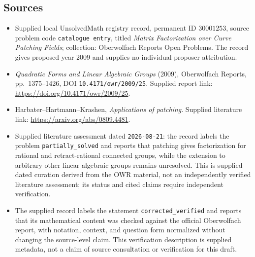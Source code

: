 \documentclass[11pt]{article}
\begin{document}
\subsection{Sources}
\begin{itemize}
\item Supplied local UnsolvedMath registry record, permanent ID \(30001253\), source problem code \texttt{catalogue entry}, titled \emph{Matrix Factorization over Curve Patching Fields}; collection: Oberwolfach Reports Open Problems. The record gives proposed year 2009 and supplies no individual proposer attribution.
\item \emph{Quadratic Forms and Linear Algebraic Groups} (2009), Oberwolfach Reports, pp.\ 1375--1426, DOI \texttt{10.4171/owr/2009/25}. Supplied report link: \url{https://doi.org/10.4171/owr/2009/25}.
\item Harbater--Hartmann--Krashen, \emph{Applications of patching}. Supplied literature link: \url{https://arxiv.org/abs/0809.4481}.
\item Supplied literature assessment dated \texttt{2026-08-21}: the record labels the problem \texttt{partially\_solved} and reports that patching gives factorization for rational and retract-rational connected groups, while the extension to arbitrary other linear algebraic groups remains unresolved. This is supplied dated curation derived from the OWR material, not an independently verified literature assessment; its status and cited claims require independent verification.
\item The supplied record labels the statement \texttt{corrected\_verified} and reports that its mathematical content was checked against the official Oberwolfach report, with notation, context, and question form normalized without changing the source-level claim. This verification description is supplied metadata, not a claim of source consultation or verification for this draft.
\end{itemize}
\end{document}
